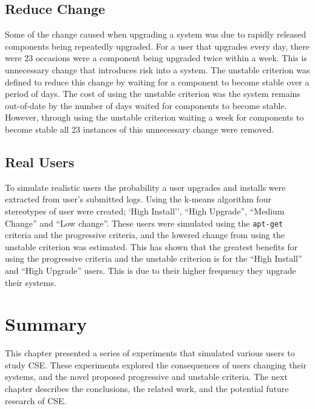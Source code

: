 \subsection{Reduce Change}
Some of the change caused when upgrading a system was due to rapidly released components being repeatedly upgraded.
For a user that upgrades every day, there were 23 occasions were a component being upgraded twice within a week.
This is unnecessary change that introduces risk into a system. 
The unstable criterion was defined to reduce this change by waiting for a component to become stable over a period of days.
The cost of using the unstable criterion was the system remains out-of-date by the number of days waited for components to become stable.
However, through using the unstable criterion waiting a week for components to become stable all 23 instances of this unnecessary change were removed.

\subsection{Real Users}
To simulate realistic users the probability a user upgrades and installs were extracted from user's submitted logs.
Using the k-means algorithm four stereotypes of user were created; `High Install'', ``High Upgrade'', ``Medium Change'' and ``Low change''.
These users were simulated using the \texttt{apt-get} criteria and the progressive criteria, and the lowered change from using the unstable criterion was estimated.
This has shown that the greatest benefits for using the progressive criteria and the unstable criterion is for the ``High Install'' and ``High Upgrade'' users.
This is due to their higher frequency they upgrade their systems.

\section{Summary}
This chapter presented a series of experiments that simulated various users to study CSE.
These experiments explored the consequences of users changing their systems, and the novel proposed progressive and unstable criteria.
The next chapter describes the conclusions, the related work, and the potential future research of CSE.



